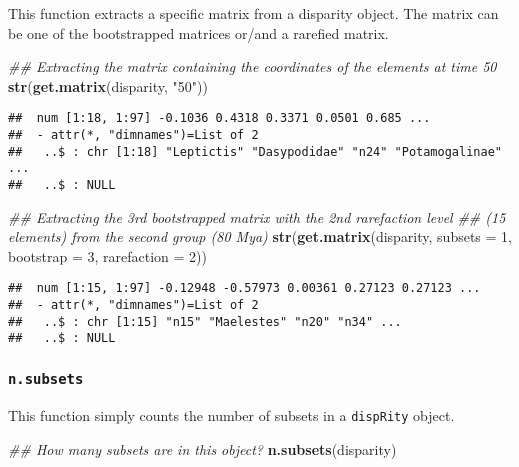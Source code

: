 \documentclass[
]{book}
\newenvironment{Shaded}{\begin{snugshade}}{\end{snugshade}}
\newcommand{\CommentTok}[1]{\textcolor[rgb]{0.56,0.35,0.01}{\textit{#1}}}
\newcommand{\DataTypeTok}[1]{\textcolor[rgb]{0.13,0.29,0.53}{#1}}
\newcommand{\DecValTok}[1]{\textcolor[rgb]{0.00,0.00,0.81}{#1}}
\newcommand{\KeywordTok}[1]{\textcolor[rgb]{0.13,0.29,0.53}{\textbf{#1}}}
\newcommand{\NormalTok}[1]{#1}
\newcommand{\StringTok}[1]{\textcolor[rgb]{0.31,0.60,0.02}{#1}}
\begin{document}
This function extracts a specific matrix from a disparity object.
The matrix can be one of the bootstrapped matrices or/and a rarefied matrix.

\begin{Shaded}
\begin{Highlighting}[]
\CommentTok{\#\# Extracting the matrix containing the coordinates of the elements at time 50}
\KeywordTok{str}\NormalTok{(}\KeywordTok{get.matrix}\NormalTok{(disparity, }\StringTok{"50"}\NormalTok{))}
\end{Highlighting}
\end{Shaded}

\begin{verbatim}
##  num [1:18, 1:97] -0.1036 0.4318 0.3371 0.0501 0.685 ...
##  - attr(*, "dimnames")=List of 2
##   ..$ : chr [1:18] "Leptictis" "Dasypodidae" "n24" "Potamogalinae" ...
##   ..$ : NULL
\end{verbatim}

\begin{Shaded}
\begin{Highlighting}[]
\CommentTok{\#\# Extracting the 3rd bootstrapped matrix with the 2nd rarefaction level}
\CommentTok{\#\# (15 elements) from the second group (80 Mya)}
\KeywordTok{str}\NormalTok{(}\KeywordTok{get.matrix}\NormalTok{(disparity, }\DataTypeTok{subsets =} \DecValTok{1}\NormalTok{, }\DataTypeTok{bootstrap =} \DecValTok{3}\NormalTok{, }\DataTypeTok{rarefaction =} \DecValTok{2}\NormalTok{))}
\end{Highlighting}
\end{Shaded}

\begin{verbatim}
##  num [1:15, 1:97] -0.12948 -0.57973 0.00361 0.27123 0.27123 ...
##  - attr(*, "dimnames")=List of 2
##   ..$ : chr [1:15] "n15" "Maelestes" "n20" "n34" ...
##   ..$ : NULL
\end{verbatim}

\hypertarget{n.subsets}{%
\subsubsection{\texorpdfstring{\texttt{n.subsets}}{n.subsets}}\label{n.subsets}}

This function simply counts the number of subsets in a \texttt{dispRity} object.

\begin{Shaded}
\begin{Highlighting}[]
\CommentTok{\#\# How many subsets are in this object?}
\KeywordTok{n.subsets}\NormalTok{(disparity)}
\end{Highlighting}
\end{Shaded}
\end{document}
